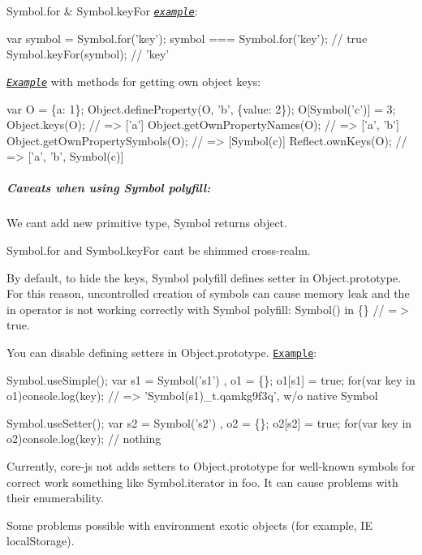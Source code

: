  {\ttfamily Symbol.\+for} \& {\ttfamily Symbol.\+key\+For} \href{http://goo.gl/0pdJjX}{\tt {\itshape example}}\+: 
\begin{DoxyCode}
var symbol = Symbol.for('key');
symbol === Symbol.for('key'); // true
Symbol.keyFor(symbol);        // 'key'
\end{DoxyCode}
 \href{http://goo.gl/mKVOQJ}{\tt {\itshape Example}} with methods for getting own object keys\+: 
\begin{DoxyCode}
var O = \{a: 1\};
Object.defineProperty(O, 'b', \{value: 2\});
O[Symbol('c')] = 3;
Object.keys(O);                  // => ['a']
Object.getOwnPropertyNames(O);   // => ['a', 'b']
Object.getOwnPropertySymbols(O); // => [Symbol(c)]
Reflect.ownKeys(O);              // => ['a', 'b', Symbol(c)]
\end{DoxyCode}
 \subparagraph*{Caveats when using {\ttfamily Symbol} polyfill\+:}


\begin{DoxyItemize}
\item We can\textquotesingle{}t add new primitive type, {\ttfamily Symbol} returns object.
\item {\ttfamily Symbol.\+for} and {\ttfamily Symbol.\+key\+For} can\textquotesingle{}t be shimmed cross-\/realm.
\item By default, to hide the keys, {\ttfamily Symbol} polyfill defines setter in {\ttfamily Object.\+prototype}. For this reason, uncontrolled creation of symbols can cause memory leak and the {\ttfamily in} operator is not working correctly with {\ttfamily Symbol} polyfill\+: {\ttfamily Symbol() in \{\} // =$>$ true}.
\end{DoxyItemize}

You can disable defining setters in {\ttfamily Object.\+prototype}. \href{http://goo.gl/N5UD7J}{\tt Example}\+: 
\begin{DoxyCode}
Symbol.useSimple();
var s1 = Symbol('s1')
  , o1 = \{\};
o1[s1] = true;
for(var key in o1)console.log(key); // => 'Symbol(s1)\_t.qamkg9f3q', w/o native Symbol

Symbol.useSetter();
var s2 = Symbol('s2')
  , o2 = \{\};
o2[s2] = true;
for(var key in o2)console.log(key); // nothing
\end{DoxyCode}

\begin{DoxyItemize}
\item Currently, {\ttfamily core-\/js} not adds setters to {\ttfamily Object.\+prototype} for well-\/known symbols for correct work something like {\ttfamily Symbol.\+iterator in foo}. It can cause problems with their enumerability.
\item Some problems possible with environment exotic objects (for example, IE {\ttfamily local\+Storage}).
\end{DoxyItemize}


